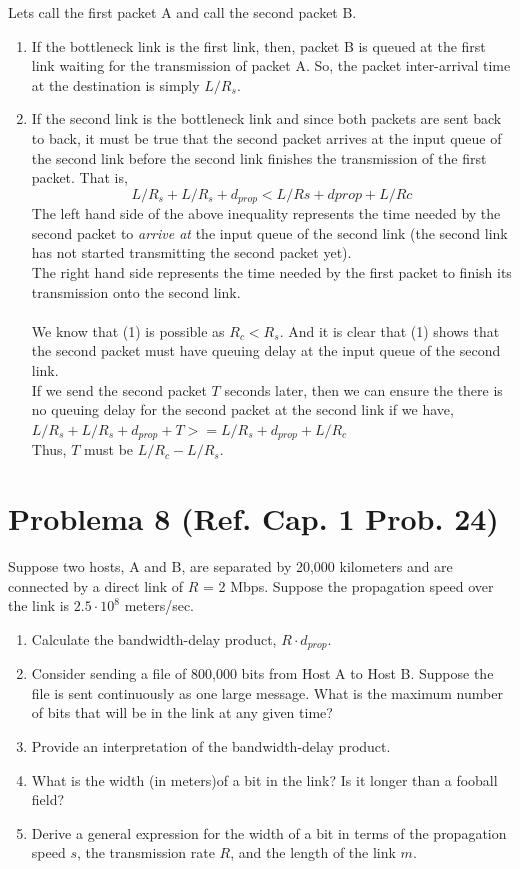 \documentclass[10pt,spanish]{article}
\numberwithin{figure}{section} %
\newcommand{\italic}[1]{\textit{#1}} %
\begin{document}
Lets call the first packet A and call the second packet B.
\begin{enumerate}
\item If the bottleneck link is the first link, then, packet B is queued at the first link waiting for the transmission of packet A. So, the packet inter-arrival time at the destination is simply $L/R_s$.
\item If the second link is the bottleneck link and since both packets are sent back to back, it must be true that the second packet arrives at the input queue of the second link before the second link finishes the transmission of the first packet. That is,
\begin{equation} L/R_s + L/R_s + d_{prop} < L/Rs + dprop + L/Rc \end{equation}
The left hand side of the above inequality represents the time needed by the second packet to \italic{arrive at} the input queue of the second link (the second link has not started transmitting the second packet yet).\\
The right hand side represents the time needed by the first packet to finish its transmission onto the second link.\\
 \\
We know that (1) is possible as $R_c < R_s$. And it is clear that (1) shows that the second packet must have queuing delay at the input queue of the second link.\\
If we send the second packet $T$ seconds later, then we can ensure the there is no queuing delay for the second packet at the second link if we have,\\
$L/R_s + L/R_s + d_{prop} + T >= L/R_s + d_{prop} + L/R_c$\\
Thus, $T$ must be $L/R_c - L/R_s$.
\end{enumerate}

\section[Problema 8]{Problema 8 \textnormal{\Large{(Ref. Cap. 1 Prob. 24)}}}

Suppose two hosts, A and B, are separated by 20,000 kilometers and are connected by a direct link of $R$ = 2 Mbps. Suppose the propagation speed over the link is $2.5 \cdot 10^8$ meters/sec.
\begin{enumerate}
\item Calculate the bandwidth-delay product, $R \cdot d_{prop}$.
\item Consider sending a file of 800,000 bits from Host A to Host B. Suppose the file is sent continuously as one large message. What is the maximum number of bits that will be in the link at any given time?
\item Provide an interpretation of the bandwidth-delay product.
\item What is the width (in meters)of a bit in the link? Is it longer than a fooball field?
\item Derive a general expression for the width of a bit in terms of the propagation speed $s$, the transmission rate $R$, and the length of the link $m$.

\end{enumerate}
\end{document}
